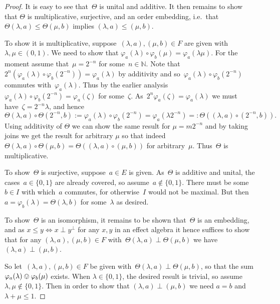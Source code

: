 \documentclass[a4paper, onecolumn, accepted=2020-12-22]{quantumarticle}
\newcommand{\N}{\mathbb{N}}
\newcommand{\mult}{\mathop{\circ}}
\theoremstyle{definition}
\begin{document}
\begin{proof}
    It is easy to see that~$\Theta$ is unital and additive.
    It then remains to show that $\Theta$ is multiplicative, surjective, and an order embedding, i.e.~that $\Theta(\lambda,a)\leq \Theta(\mu,b)$ implies $(\lambda,a)\leq (\mu,b)$.

To show it is multiplicative, suppose~$(\lambda,a), (\mu,b) \in F$ 
  are given with $\lambda,\mu \in (0,1)$. 
We need to show that $\varphi_a(\lambda)\mult \varphi_b(\mu) 
  = \varphi_a(\lambda\mu)$.
For the moment assume that~$\mu = 2^{-n}$ for some~$n \in \N$.
    Note that~$2^n ( \varphi_a(\lambda) \mult \varphi_b(2^{-n}) )
        = \varphi_a(\lambda)$ by additivity
            and so~$\varphi_a(\lambda) \mult \varphi_b(2^{-n})$ commutes
                with~$\varphi_a(\lambda)$.
        Thus by the earlier
        analysis~$\varphi_a(\lambda) \mult \varphi_b(2^{-n}) = \varphi_a(\zeta)$
            for some~$\zeta$.
            As~$2^n \varphi_a(\zeta) = \varphi_a(\lambda)$
                we must have~$\zeta = 2^{-n}\lambda$,
                and hence
                \[\Theta(\lambda, a) \mult
                            \Theta(2^{-n}, b)
                    := \varphi_a(\lambda) \mult \varphi_b(2^{-n})
                    = \varphi_a(\lambda 2^{-n})
                    =: \Theta((\lambda, a) \mult (2^{-n}, b)).\]
            Using additivity of $\Theta$ we can show the same result for $\mu = m2^{-n}$ and by taking joins we get the result for arbitrary $\mu$ so that indeed~$\Theta(\lambda, a) \mult \Theta(\mu, b)
                    = \Theta((\lambda, a) \mult (\mu, b))$
                for arbitrary~$\mu$.
                Thus~$\Theta$ is multiplicative.
        
To show~$\Theta$ is surjective, suppose~$a \in E$ is given.
As~$\Theta$ is additive and unital, the cases~$a \in \{0,1\}$
    are already covered, so assume~$a \notin \{0,1\}$.
There must be some~$b \in I$ with which~$a$ commutes,
    for otherwise~$I$ would not be maximal.
But then~$a = \varphi_b(\lambda)
        = \Theta(\lambda, b)$ for some~$\lambda$ as desired.

To show~$\Theta$ is an isomorphism, it remains to be shown
    that~$\Theta$ is an embedding, and as $x\leq y \iff x\perp y^\perp$
    for any $x,y$ in an effect algebra
    it hence suffices to show that for any
    $(\lambda,a),(\mu, b) \in F$
    with~$\Theta(\lambda, a) \perp \Theta(\mu, b)$ we have 
    $(\lambda,a) \perp (\mu, b)$.

So let~$(\lambda,a),(\mu, b) \in F$
    be given with~$\Theta(\lambda, a) \perp \Theta(\mu, b)$,
    so that the sum $\varphi_a(\lambda)\ovee \varphi_b(\mu)$ exists.
    When $\lambda\in \{0,1\}$, the desired result is trivial, so assume $\lambda,\mu \notin \{0,1\}$.
    Then in order to show that $(\lambda,a) \perp (\mu, b)$ 
    we need $a=b$ and $\lambda+\mu \leq 1$.


\end{proof}
\end{document}
